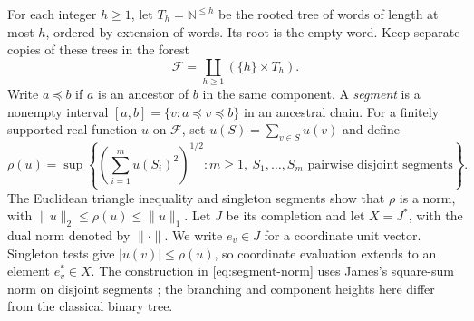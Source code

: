 For each integer $h\ge1$, let $T_h=\mathbb N^{\le h}$ be the
rooted tree of words of length at most $h$, ordered by extension of
words. Its root is the empty word. Keep separate copies of these trees
in the forest
\[
 \mathcal F=\coprod_{h\ge1}(\{h\}\times T_h).
\]
Write $a\preceq b$ if $a$ is an ancestor of $b$ in the same component.
A \emph{segment} is a nonempty interval
$[a,b]=\{v:a\preceq v\preceq b\}$ in an ancestral chain.
For a finitely supported real function $u$ on $\mathcal F$, set
$u(S)=\sum_{v\in S}u(v)$ and define
\begin{equation}\label{eq:segment-norm}
 \rho(u)=\sup\left\{\left(\sum_{i=1}^m u(S_i)^2\right)^{1/2}:
  m\ge1,\ S_1,\ldots,S_m\text{ pairwise disjoint segments}\right\}.
\end{equation}
The Euclidean triangle inequality and singleton segments show that
$\rho$ is a norm, with $\|u\|_2\le\rho(u)\le\|u\|_1$.
Let $J$ be its completion and let $X=J^*$, with
the dual norm denoted by $\|\cdot\|$. We write $e_v\in J$ for a
coordinate unit vector. Singleton tests give $|u(v)|\le\rho(u)$,
so coordinate evaluation extends to an element $e_v^*\in X$.
The construction in \eqref{eq:segment-norm} uses James's
square-sum norm on disjoint segments \cite[p.~739]{James1974}; the
branching and component heights here differ from the classical binary
tree.
